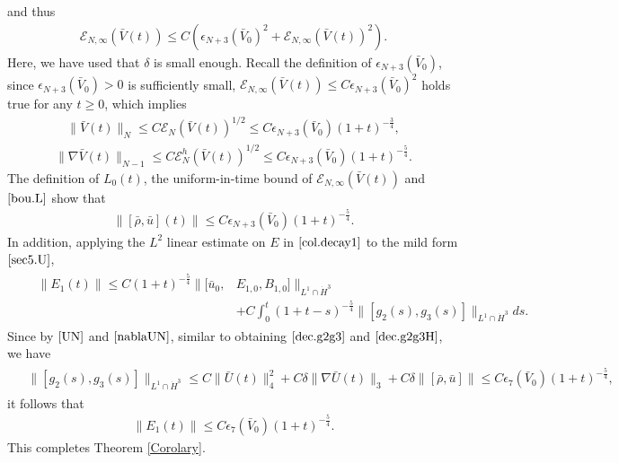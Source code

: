 \documentclass[11pt]{amsart}
\numberwithin{equation}{section}
\begin{document}
and thus
\begin{eqnarray}\label{ENb}
\mathcal {E}_{N,\infty}(\bar{V}(t))
 \leq C \left( \epsilon_{N+3}(\bar{V}_{0})^{2}+
\mathcal {E}_{N,\infty}(\bar{V}(t))^{2}\right).
\end{eqnarray}
Here, we have used that $\delta$ is small enough. Recall the
definition of $\epsilon_{N+3}(\bar{V}_{0})$, since
$\epsilon_{N+3}(\bar{V}_{0})>0$ is sufficiently small, $\mathcal
{E}_{N,\infty}(\bar{V}(t)) \leq C \epsilon_{N+3}(\bar{V}_{0})^{2}$
holds true for any $t\geq 0$, which implies
\begin{eqnarray}\label{UN}
\|\bar{V}(t)\|_{N} \leq C \mathcal {E}_{N}(\bar{V}(t))^{1/2}
 \leq C  \epsilon_{N+3}(\bar{V}_{0})(1+t)^{-\frac{3}{4}},
\end{eqnarray}
\begin{eqnarray}\label{nablaUN}
\|\nabla\bar{V}(t)\|_{N-1} \leq C \mathcal
{E}_{N}^{h}(\bar{V}(t))^{1/2}
 \leq C  \epsilon_{N+3}(\bar{V}_{0})(1+t)^{-\frac{5}{4}}.
\end{eqnarray}
The definition of $L_{0}(t)$, the uniform-in-time bound of $\mathcal
{E}_{N,\infty}(\bar{V}(t))$ and $\eqref{bou.L}$ show that
\begin{eqnarray*}
\|[\bar{\rho},\bar{u}](t)\|
 \leq C  \epsilon_{N+3}(\bar{V}_{0})(1+t)^{-\frac{5}{4}}.
\end{eqnarray*}
In addition, applying the $L^{2}$ linear estimate on $E$ in
$\eqref{col.decay1}$ to the mild form $\eqref{sec5.U}$,
\begin{eqnarray*}
&&\begin{aligned} \|E_{1}(t)\|\leq C (1+t)^{-\frac{5}{4}}
 \|[\bar{u}_{0},& E_{1,0},B_{1,0}]\|_{L^1\cap \dot{H}^{3}}\\
  &+C \int_{0}^{t}(1+t-s)^{-\frac{5}{4}}\|[g_{2}(s),g_{3}(s)]\|_{L^{1}\cap
  \dot{H}^{3}}ds.
 \end{aligned}
\end{eqnarray*}
Since by $\eqref{UN}$ and $\eqref{nablaUN}$, similar to obtaining
$\eqref{dec.g2g3}$ and $\eqref{dec.g2g3H}$, we have
\begin{eqnarray*}
\begin{aligned}
&\|[g_{2}(s),g_{3}(s)]\|_{L^{1}\cap \dot{H}^{3}}\leq
C\|\bar{U}(t)\|^{2}_{4}+ C\delta\|\nabla
\bar{U}(t)\|_{3}+C\delta\|[\bar{\rho},\bar{u}]\|\leq
C\epsilon_{7}(\bar{V}_{0})(1+t)^{-\frac{5}{4}},
\end{aligned}
\end{eqnarray*}
it follows that
\begin{eqnarray}\label{uL2}
\|E_{1}(t)\| \leq C\epsilon_{7}(\bar{V}_{0})(1+t)^{-\frac{5}{4}}.
\end{eqnarray}
This completes Theorem \ref{Corolary}.
\end{document}
